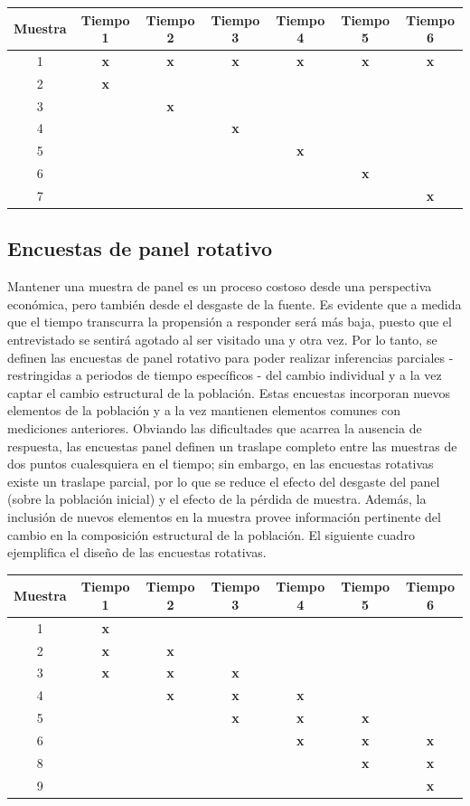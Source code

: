 \documentclass[12pt,spanish,]{book}
\begin{document}
\begin{longtable}[]{@{}ccccccc@{}}
\toprule
Muestra & Tiempo 1 & Tiempo 2 & Tiempo 3 & Tiempo 4 & Tiempo 5 & Tiempo 6\tabularnewline
\midrule
\endhead
1 & \textbf{x} & \textbf{x} & \textbf{x} & \textbf{x} & \textbf{x} & \textbf{x}\tabularnewline
2 & \textbf{x} & & & & &\tabularnewline
3 & & \textbf{x} & & & &\tabularnewline
4 & & & \textbf{x} & & &\tabularnewline
5 & & & & \textbf{x} & &\tabularnewline
6 & & & & & \textbf{x} &\tabularnewline
7 & & & & & & \textbf{x}\tabularnewline
\bottomrule
\end{longtable}

\hypertarget{encuestas-de-panel-rotativo}{%
\subsection{Encuestas de panel rotativo}\label{encuestas-de-panel-rotativo}}

Mantener una muestra de panel es un proceso costoso desde una perspectiva económica, pero también desde el desgaste de la fuente. Es evidente que a medida que el tiempo transcurra la propensión a responder será más baja, puesto que el entrevistado se sentirá agotado al ser visitado una y otra vez. Por lo tanto, se definen las encuestas de panel rotativo para poder realizar inferencias parciales - restringidas a periodos de tiempo específicos - del cambio individual y a la vez captar el cambio estructural de la población. Estas encuestas incorporan nuevos elementos de la población y a la vez mantienen elementos comunes con mediciones anteriores. Obviando las dificultades que acarrea la ausencia de respuesta, las encuestas panel definen un traslape completo entre las muestras de dos puntos cualesquiera en el tiempo; sin embargo, en las encuestas rotativas existe un traslape parcial, por lo que se reduce el efecto del desgaste del panel (sobre la población inicial) y el efecto de la pérdida de muestra. Además, la inclusión de nuevos elementos en la muestra provee información pertinente del cambio en la composición estructural de la población. El siguiente cuadro ejemplifica el diseño de las encuestas rotativas.

\begin{longtable}[]{@{}ccccccc@{}}
\toprule
Muestra & Tiempo 1 & Tiempo 2 & Tiempo 3 & Tiempo 4 & Tiempo 5 & Tiempo 6\tabularnewline
\midrule
\endhead
1 & \textbf{x} & & & & &\tabularnewline
2 & \textbf{x} & \textbf{x} & & & &\tabularnewline
3 & \textbf{x} & \textbf{x} & \textbf{x} & & &\tabularnewline
4 & & \textbf{x} & \textbf{x} & \textbf{x} & &\tabularnewline
5 & & & \textbf{x} & \textbf{x} & \textbf{x} &\tabularnewline
6 & & & & \textbf{x} & \textbf{x} & \textbf{x}\tabularnewline
8 & & & & & \textbf{x} & \textbf{x}\tabularnewline
9 & & & & & & \textbf{x}\tabularnewline
\bottomrule
\end{longtable}
\end{document}
